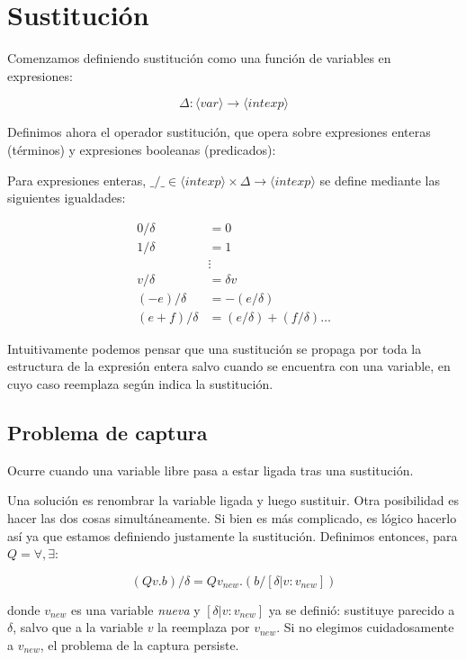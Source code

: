 \documentclass[a4paper,12pt]{article}
\begin{document}
\section{Sustitución}

 Comenzamos definiendo sustitución como una función de variables en expresiones:

\[
\Delta : \langle var \rangle \rightarrow \langle intexp \rangle
\]

Definimos ahora el operador sustitución, que opera sobre expresiones enteras (términos) y expresiones booleanas (predicados):

Para expresiones enteras, $\_ / \_ \in \langle intexp \rangle \times \Delta \to \langle intexp \rangle$ se define mediante las siguientes igualdades:

\begin{align*}
    0/\delta &= 0 \\
    1/\delta &= 1 \\
    &\vdots \\
    v/\delta &= \delta v \\
    (-e)/\delta &= -(e/\delta) \\
    (e + f)/\delta &= (e/\delta) + (f/\delta) \dots
\end{align*}

Intuitivamente podemos pensar que una sustitución se propaga por toda la estructura de la expresión entera salvo cuando se encuentra con una variable, en cuyo caso reemplaza según indica la sustitución.

\subsection{Problema de captura}

Ocurre cuando una variable libre pasa a estar ligada tras una sustitución.

Una solución es renombrar la variable ligada y luego sustituir. Otra posibilidad es hacer las dos cosas simultáneamente. Si bien es más complicado, es lógico hacerlo así ya que estamos definiendo justamente la sustitución. Definimos entonces, para $Q = \forall, \exists$:

\[
(Qv. b) / \delta = Qv_{new} . (b / [\delta | v : v_{new}])
\]

donde $v_{new}$ es una variable \textit{nueva} y $[\delta | v : v_{new}]$ ya se definió: sustituye parecido a $\delta$, salvo que a la variable $v$ la reemplaza por $v_{new}$. Si no elegimos cuidadosamente a $v_{new}$, el problema de la captura persiste. 
\end{document}
